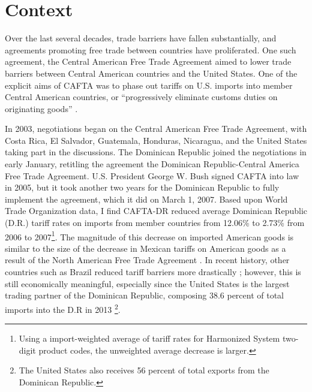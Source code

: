\documentclass[12pt]{article}
\begin{document}

\vspace{-10pt}
\section{Context}
\label{sec:Context}
Over the last several decades, trade barriers have fallen substantially, and agreements promoting
free trade between countries have proliferated. One such agreement, the Central American Free Trade 
Agreement aimed to lower trade barriers between Central American countries and 
the United States. One of the explicit aims of CAFTA was to phase out tariffs on U.S. 
imports into member Central American countries, or ``progressively eliminate customs duties on 
originating goods'' \citep{ustraderep}.

In 2003, negotiations began on the Central American Free Trade Agreement, with Costa Rica, El 
Salvador, Guatemala, Honduras, Nicaragua, and the United States taking part in the discussions. The 
Dominican Republic joined the negotiations in early January, retitling the agreement the Dominican 
Republic-Central America Free Trade Agreement. U.S. President George W. 
Bush signed CAFTA into law in 2005, but it took another two years for the 
Dominican Republic to fully implement the agreement, which it did on March 1, 2007.
Based upon World Trade Organization data,
I find CAFTA-DR reduced average Dominican 
Republic (D.R.) tariff rates on imports from member countries from 12.06\% to 2.73\% from 2006 to 
2007\footnote{Using a import-weighted average
of tariff rates for Harmonized System two-digit product codes, 
the unweighted average decrease is larger.}. The magnitude of this decrease on imported American
goods is similar to the size of the decrease in Mexican tariffs on American goods as a result of the
North American Free Trade Agreement \citep{goldberg}. 
In recent history, other countries such as Brazil reduced tariff barriers more drastically
\citep{kovak}; however, this is still economically meaningful, especially since the United States 
is the largest trading partner of the Dominican Republic, composing 
38.6 percent of  total imports into the D.R in 2013 \citep{wtocountry}\footnote{The 
United States also receives 56 percent of total exports from the Dominican Republic.}.
\end{document}
